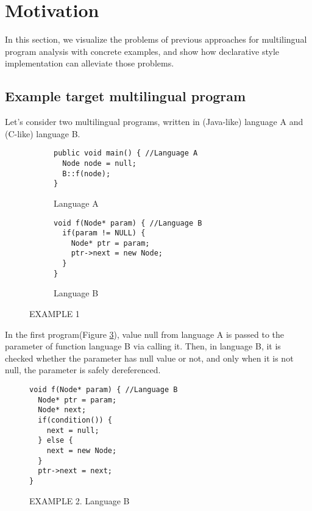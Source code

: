 \section{Motivation}

In this section, we visualize the problems of previous approaches for
multilingual program analysis with concrete examples, and show how declarative
style implementation can alleviate those problems.

\subsection{Example target multilingual program}

Let's consider two multilingual programs, written in (Java-like) language A
and (C-like) language B.
\begin{figure}[t]
  \centering
  \vspace{2mm}
  \begin{subfigure}[t]{0.5\textwidth}
    \begin{lstlisting}[style=java,xleftmargin=2.5em]
public void main() { //Language A
  Node node = null;
  B::f(node);
}
    \end{lstlisting}
    \vspace*{-.5em}
    \caption{Language A}
    \label{fig:exam1:langA}
  \end{subfigure}
  \begin{subfigure}[t]{0.5\textwidth}
    \begin{lstlisting}[style=cpp,firstnumber=5,xleftmargin=2.5em]
void f(Node* param) { //Language B
  if(param != NULL) {
    Node* ptr = param;
    ptr->next = new Node;
  }
}
    \end{lstlisting}
    \vspace*{-.5em}
    \caption{Language B}
    \label{fig:exam1:langB}
  \end{subfigure}
  \vspace*{-.5em}
  \caption{EXAMPLE 1}
  \label{fig:exam1}
\end{figure}

In the first program(Figure \ref{fig:exam1}), value null from language A is
passed to the parameter of function language B via calling it. Then, in
language B, it is checked whether the parameter has null value or not, and only
when it is not null, the parameter is safely dereferenced.

\begin{figure}[t]
  \centering
  \vspace{2mm}
  \begin{lstlisting}[style=cpp,firstnumber=5,xleftmargin=2.5em]
void f(Node* param) { //Language B
  Node* ptr = param;
  Node* next;
  if(condition()) {
    next = null;
  } else {
    next = new Node;
  }
  ptr->next = next;
}
  \end{lstlisting}
  \vspace*{-.5em}
  \caption{EXAMPLE 2. Language B}
  \label{fig:exam2}
\end{figure}

